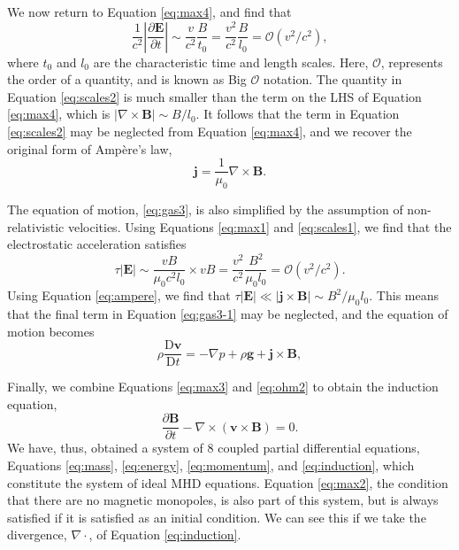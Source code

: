 We now return to Equation \eqref{eq:max4}, and find that
%
\begin{equation}
\label{eq:scales2}
\frac{1}{c^2} \left| \frac{\partial \mathbf{E}}{\partial t} \right|
\sim \frac{v}{c^2} \frac{B}{t_0}
= \frac{v^2}{c^2} \frac{B}{l_0}
= \mathcal{O}(v^2/c^2),
\end{equation}
%
where $t_0$ and $l_0$ are the characteristic time and length scales.
Here, $\mathcal{O}$, represents the order of a quantity, and is known as Big $\mathcal{O}$ notation.
The quantity in Equation \eqref{eq:scales2} is much smaller than the term on the LHS of Equation \eqref{eq:max4}, which is $|\nabla \times \mathbf{B}| \sim B / l_0$.
It follows that the term in Equation \eqref{eq:scales2} may be neglected from Equation \eqref{eq:max4}, and we recover the original form of Amp\`ere's law,
%
\begin{equation}
\label{eq:ampere}
\mathbf j = \frac{1}{\mu_0} \nabla \times \mathbf B.
\end{equation}
%

The equation of motion, \eqref{eq:gas3}, is also simplified by the assumption of non-relativistic velocities.
Using Equations \eqref{eq:max1} and \eqref{eq:scales1}, we find that the electrostatic acceleration satisfies
%
\begin{equation}
\label{eq:scales3}
\tau |\mathbf{E}| \sim \frac{v B}{\mu_0 c^2 l_0} \times v B
= \frac{v^2}{c^2} \frac{B^2}{\mu_0 l_0}
= \mathcal{O}(v^2/c^2).
\end{equation}
%
Using Equation \eqref{eq:ampere}, we find that $\tau |\mathbf{E}| \ll |\mathbf{j} \times \mathbf{B}| \sim B^2 / \mu_0 l_0$.
This means that the final term in Equation \eqref{eq:gas3-1} may be neglected, and the equation of motion becomes
%
\begin{equation}
\label{eq:momentum}
\rho \frac{\mathrm{D} \mathbf v}{\mathrm{D} t} = - \nabla p + \rho \mathbf{g} + \mathbf{j} \times \mathbf{B},
\end{equation}
%

Finally, we combine Equations \eqref{eq:max3} and \eqref{eq:ohm2} to obtain the induction equation,
%
\begin{equation}
\label{eq:induction}
\frac{\partial \mathbf{B}}{\partial t} - \nabla \times ( \mathbf{v} \times \mathbf{B} ) = 0.
\end{equation}
%
We have, thus, obtained a system of 8 coupled partial differential equations, Equations \eqref{eq:mass}, \eqref{eq:energy}, \eqref{eq:momentum}, and \eqref{eq:induction}, which constitute the system of ideal MHD equations.
Equation \eqref{eq:max2}, the condition that there are no magnetic monopoles, is also part of this system, but is always satisfied if it is satisfied as an initial condition.
We can see this if we take the divergence, $\nabla \cdot$, of Equation \eqref{eq:induction}.

